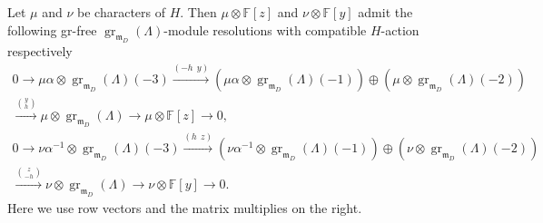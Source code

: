 \documentclass[11pt,a4paper]{article} %
\def\FF{\mathbb{F}}
\def\gr{\operatorname{gr}}
\begin{document}
\begin{lemma}\label{lem:y-z-resolution}
    Let $\mu$ and $\nu$ be characters of $H$. Then $\mu\otimes\FF[z]$ and $\nu\otimes\FF[y]$ admit the following gr-free $\gr_{\mathfrak{m}_D}(\Lambda)$-module resolutions with compatible $H$-action respectively
\begin{equation}\label{eq:resolution-Fz}
\begin{split}
    0\longrightarrow\mu\alpha\otimes\gr_{\mathfrak{m}_D}(\Lambda)(-3)\xrightarrow{(-h\ \ y)}\left(\mu\alpha\otimes\gr_{\mathfrak{m}_D}(\Lambda)(-1)\right)\oplus\left(\mu\otimes\gr_{\mathfrak{m}_D}(\Lambda)(-2)\right)\\
    \xrightarrow{\binom{y}{h}}
 \mu\otimes\gr_{\mathfrak{m}_D}(\Lambda)
 \longrightarrow\mu\otimes\FF[z]\longrightarrow0,
\end{split}
\end{equation}
\begin{equation}\label{eq:resolution-Fy}
\begin{split}
    0\longrightarrow\nu\alpha^{-1}\otimes\gr_{\mathfrak{m}_D}(\Lambda)(-3)\xrightarrow{(h\ \ z)}\left(\nu\alpha^{-1}\otimes\gr_{\mathfrak{m}_D}(\Lambda)(-1)\right)\oplus\left(\nu\otimes\gr_{\mathfrak{m}_D}(\Lambda)(-2)\right)\\
    \xrightarrow{\binom{z}{-h}}
 \nu\otimes\gr_{\mathfrak{m}_D}(\Lambda)
 \longrightarrow\nu\otimes\FF[y]\longrightarrow0.
\end{split}
\end{equation}
Here we use row vectors and the matrix multiplies on the right.
\end{lemma}
\end{document}
